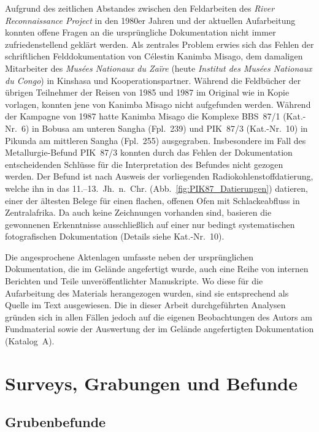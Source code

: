 Aufgrund des zeitlichen Abstandes zwischen den Feldarbeiten des \textit{River Reconnaissance Project} in den 1980er Jahren und der aktuellen Aufarbeitung konnten offene Fragen an die ursprüngliche Dokumentation nicht immer zufriedenstellend geklärt werden. Als zentrales Problem erwies sich das Fehlen der schriftlichen Felddokumentation von Célestin Kanimba Misago, dem damaligen Mitarbeiter des \textit{Musées Nationaux du Zaïre} (heute \textit{Institut des Musées Nationaux du Congo}) in Kinshasa und Kooperationspartner. Während die Feldbücher der übrigen Teilnehmer der Reisen von 1985 und 1987 im Original wie in Kopie vorlagen, konnten jene von Kanimba Misago nicht aufgefunden werden. Während der Kampagne von 1987 hatte Kanimba Misago die Komplexe BBS~87/1 (Kat.-Nr.~6) in Bobusa am unteren Sangha (Fpl.~239) und PIK~87/3 (Kat.-Nr.~10) in Pikunda am mittleren Sangha (Fpl.~255) ausgegraben. Insbesondere im Fall des Metallurgie-Befund PIK~87/3 konnten durch das Fehlen der Dokumentation entscheidenden Schlüsse für die Interpretation des Befundes nicht gezogen werden. Der Befund ist nach Ausweis der vorliegenden Radiokohlenstoffdatierung, welche ihn in das 11.--13.~Jh.~n.~Chr. (Abb.~\ref{fig:PIK87_Datierungen}) datieren, einer der ältesten Belege für einen flachen, offenen Ofen mit Schlackeabfluss in Zentralafrika. Da auch keine Zeichnungen vorhanden sind, basieren die gewonnenen Erkenntnisse ausschließlich auf einer nur bedingt systematischen fotografischen Dokumentation (Details siehe Kat.-Nr.~10).

Die angesprochene Aktenlagen umfasste neben der ursprünglichen Dokumentation, die im Gelände angefertigt wurde, auch eine Reihe von internen Berichten und Teile unveröffentlichter Manuskripte. Wo diese für die Aufarbeitung des Materials herangezogen wurden, sind sie entsprechend als Quelle im Text ausgewiesen. Die in dieser Arbeit durchgeführten Analysen gründen sich in allen Fällen jedoch auf die eigenen Beobachtungen des Autors am Fundmaterial sowie der Auswertung der im Gelände angefertigten Dokumentation (Katalog~A).

\section{Surveys, Grabungen und Befunde}\label{sec:GrabungenBefunde}

\subsection{Grubenbefunde}

